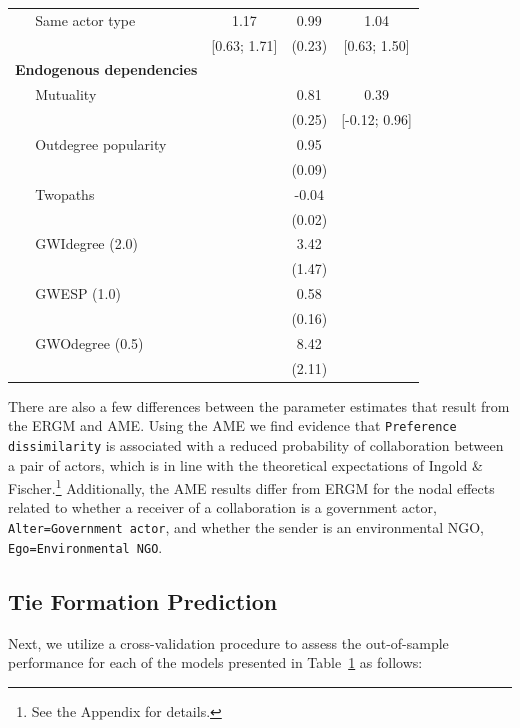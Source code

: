 \begin{table}[ht]
\begin{tabular}{lccc}
  $\;\;\;\;$ Same actor type & 1.17 & 0.99 & 1.04 \\
   & [0.63; 1.71] & (0.23) & [0.63; 1.50] \\
  \textbf{Endogenous dependencies}  &  &  &  \\
  $\;\;\;\;$ Mutuality &  & 0.81 & 0.39 \\
   &  & (0.25) & [-0.12; 0.96] \\
  $\;\;\;\;$ Outdegree popularity  &  & 0.95 &  \\
   &  & (0.09) &  \\
  $\;\;\;\;$ Twopaths  &  & -0.04 &  \\
  &  & (0.02) &  \\
  $\;\;\;\;$ GWIdegree (2.0)  &  & 3.42 &  \\
   &  & (1.47) &  \\
  $\;\;\;\;$ GWESP (1.0)  &  & 0.58 &  \\
   &  & (0.16) &  \\
  $\;\;\;\;$ GWOdegree (0.5)  &  & 8.42 &  \\
   &  & (2.11) &  \\
   \hline
\hline
\end{tabular}
\label{tab:regTable}
\end{table}
\FloatBarrier

There are also a few differences between the parameter estimates that result from the ERGM and AME. Using the AME we find evidence that \texttt{Preference dissimilarity} is associated with a reduced probability of collaboration between a pair of actors, which is in line with the theoretical expectations of Ingold \& Fischer.\footnote{See the Appendix for details.} Additionally, the AME results differ from ERGM for the nodal effects related to whether a receiver of a collaboration is a government actor, \texttt{Alter=Government actor}, and whether the sender is an environmental NGO, \texttt{Ego=Environmental NGO}.

\subsection*{Tie Formation Prediction}

Next, we utilize a cross-validation procedure to assess the out-of-sample performance for each of the models presented in Table~\ref{tab:regTable} as follows:

